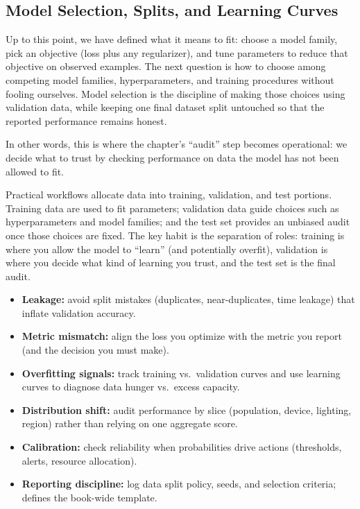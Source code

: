 \FloatBarrier

\subsection{Model Selection, Splits, and Learning Curves}\label{sec:lec1_model_selection}

Up to this point, we have defined what it means to fit: choose a model family, pick an objective (loss plus any regularizer), and tune parameters to reduce that objective on observed examples. The next question is how to choose among competing model families, hyperparameters, and training procedures without fooling ourselves. Model selection is the discipline of making those choices using validation data, while keeping one final dataset split untouched so that the reported performance remains honest.

In other words, this is where the chapter's ``audit'' step becomes operational: we decide what to trust by checking performance on data the model has not been allowed to fit.

Practical workflows allocate data into training, validation, and test portions. Training data are used to fit parameters; validation data guide choices such as hyperparameters and model families; and the test set provides an unbiased audit once those choices are fixed. The key habit is the separation of roles: training is where you allow the model to ``learn'' (and potentially overfit), validation is where you decide what kind of learning you trust, and the test set is the final audit.

\begin{tcolorbox}[summarybox, title={Risk \& audit}]
\begin{itemize}
    \item \textbf{Leakage:} avoid split mistakes (duplicates, near-duplicates, time leakage) that inflate validation accuracy.
    \item \textbf{Metric mismatch:} align the loss you optimize with the metric you report (and the decision you must make).
    \item \textbf{Overfitting signals:} track training vs.\ validation curves and use learning curves to diagnose data hunger vs.\ excess capacity.
    \item \textbf{Distribution shift:} audit performance by slice (population, device, lighting, region) rather than relying on one aggregate score.
    \item \textbf{Calibration:} check reliability when probabilities drive actions (thresholds, alerts, resource allocation).
    \item \textbf{Reporting discipline:} log data split policy, seeds, and selection criteria;  defines the book-wide template.
\end{itemize}
\end{tcolorbox}

